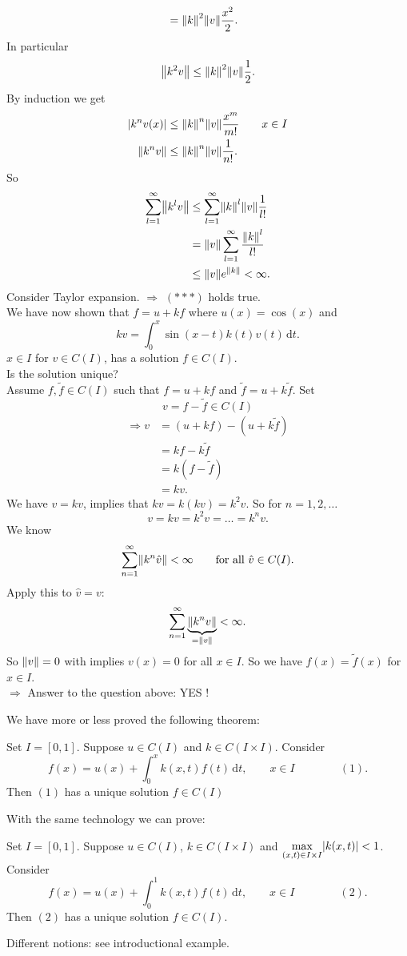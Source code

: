 \begin{enumerate}[1.]
\begin{align*}
		&= \norm{k}^2 \norm{v} \frac{x^2}{2}.
	\end{align*}
	In particular
	\[
		\norm{k^2v} \leq \norm{k}^2 \norm{v} \frac{1}{2}.
	\]
	By induction we get
	\begin{align*}
		\abs{k^n v(x)} &\leq \norm{k}^n \norm{v} \frac{x^m}{m!} \qquad x \in I \\
		\norm{k^n v} &\leq  \norm{k}^n \norm{v} \frac{1}{n!}.
	\end{align*}
	So 
	\begin{align*}
		\sum_{l=1}^{\infty}\norm{k^lv} &\leq \sum_{l=1}^{\infty}\norm{k}^l \norm{v} \frac{1}{l!} \\
		&= \norm{v} \sum_{l=1}^{\infty} \frac{\norm{k}^l}{l!} \\
		&\leq \norm{v} e^{\norm{k}} < \infty.
	\end{align*}
	Consider Taylor expansion.
	$\Rightarrow $ $(***)$ holds true. \\
	We have now shown that $f = u+kf$ where $u(x) = \cos(x)$ and
	\[
		kv = \int_{0}^{x}\sin(x-t)k(t)v(t) \,\mathrm{d}t.
	\]
	$x \in I$ for $v \in C(I)$, has a solution $f \in C(I)$. \\
	 Is the solution unique? \\
	Assume $f,\tilde f \in C(I)$ such that $f = u + k f$ and $\tilde f = u+ k \tilde f$. Set 
	\[
		v = f- \tilde f \in C(I)
	\]
	\begin{align*}
		\Rightarrow v &= (u+kf) - (u+ k \tilde f) \\ &= kf - k \tilde f \\ &= k(f- \tilde f) \\ &= kv.
	\end{align*}
	We have $v = kv$, implies that $kv = k(kv) = k^2v$. So for $n=1,2,\dots$
	\[
		v = kv = k^2v = \dots = k^nv.
	\]
	We know 
	\[
		\sum_{n=1}^{\infty}\norm{k^n \hat{v}} < \infty \qquad \text{for all }\hat{v} \in C(I).
	\]
	Apply this to $\hat{v}=v$:
	\[
		\sum_{n=1}^{\infty}\underset{=\norm{v}}{\underbrace{\norm{k^nv}}} < \infty .
	\]
	So $\norm{v}=0$ with implies $v(x)=0$ for all $x \in I$.
	So we have $f(x)=\tilde f(x)$ for $x \in I$. \\
	$\Rightarrow $ Answer to the question above: YES ! 
\end{enumerate}
We have more or less proved the following theorem:
\begin{theorem}
	Set $I=[0,1]$. Suppose $u \in C(I)$ and $k \in C(I \times I)$. Consider 
	\[
		f(x) = u(x)+ \int_{0}^{x} k(x,t) f(t) \,\mathrm{d}t, \qquad x \in I \qquad \qquad (1).
	\]
	Then $(1)$ has a unique solution $f \in C(I)$
\end{theorem}
With the same technology we can prove:
\begin{theorem}
	Set $I = [0,1]$. Suppose $u \in C(I)$, $k \in C(I \times I)$ and $\max\limits_{(x,t) \in I \times I} \lvert k(x,t)\rvert <1$. Consider \[
		f(x) = u(x) + \int_{0}^{1}k(x,t)f(t) \,\mathrm{d}t, \qquad x \in I \qquad \qquad (2).
	\]
	Then $(2)$ has a unique solution $f \in C(I)$.
\end{theorem}
Different notions: see introductional example.

